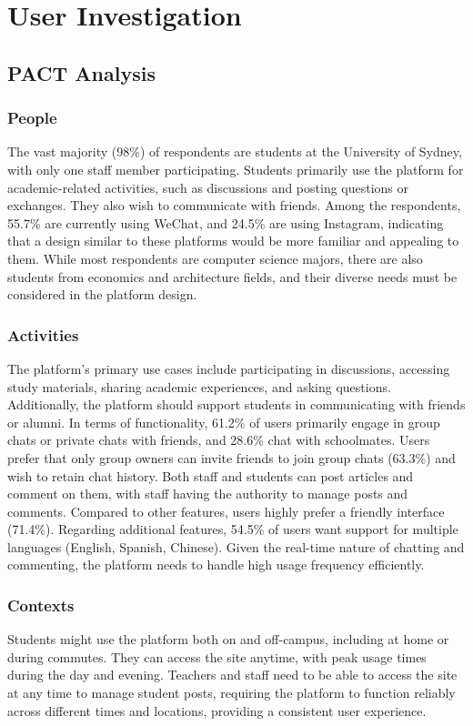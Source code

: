 \documentclass[12pt]{article}
\begin{document}
\section*{User Investigation}
    \subsection*{PACT Analysis}

        \subsubsection*{People}
            The vast majority (98\%) of respondents are students at the University of Sydney, with only one staff member participating. Students primarily use the platform for academic-related activities, such as discussions and posting questions or exchanges. They also wish to communicate with friends. Among the respondents, 55.7\% are currently using WeChat, and 24.5\% are using Instagram, indicating that a design similar to these platforms would be more familiar and appealing to them. While most respondents are computer science majors, there are also students from economics and architecture fields, and their diverse needs must be considered in the platform design.

        \subsubsection*{Activities}
            The platform's primary use cases include participating in discussions, accessing study materials, sharing academic experiences, and asking questions. Additionally, the platform should support students in communicating with friends or alumni. In terms of functionality, 61.2\% of users primarily engage in group chats or private chats with friends, and 28.6\% chat with schoolmates. Users prefer that only group owners can invite friends to join group chats (63.3\%) and wish to retain chat history. Both staff and students can post articles and comment on them, with staff having the authority to manage posts and comments. Compared to other features, users highly prefer a friendly interface (71.4\%). Regarding additional features, 54.5\% of users want support for multiple languages (English, Spanish, Chinese). Given the real-time nature of chatting and commenting, the platform needs to handle high usage frequency efficiently.


        \subsubsection*{Contexts}
            Students might use the platform both on and off-campus, including at home or during commutes. They can access the site anytime, with peak usage times during the day and evening. Teachers and staff need to be able to access the site at any time to manage student posts, requiring the platform to function reliably across different times and locations, providing a consistent user experience.
\end{document}
